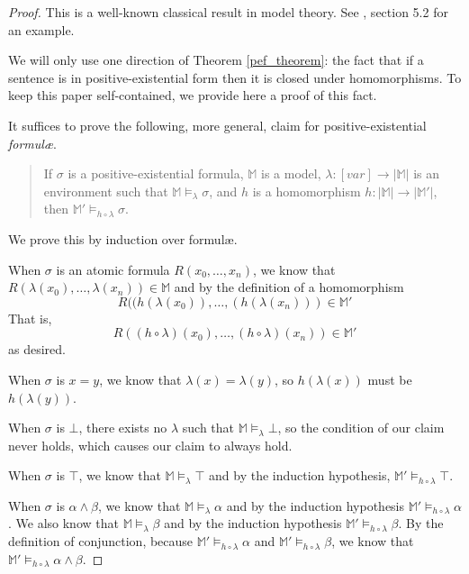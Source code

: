 		\begin{proof}
			This is a well-known classical result in model theory. See
			\cite{ChangKeisler73}, section 5.2 for an example.

			We will only use one direction of Theorem \ref{pef_theorem}: the
			fact that if a sentence is in positive-existential form then it is
			closed under homomorphisms. To keep this paper self-contained, we
			provide here a proof of this fact.

			It suffices to prove the following, more general, claim for
			positive-existential \emph{formul{\ae}}.

			\begin{quote}
				If $\sigma$ is a positive-existential formula, $\mathbb{M}$ is
				a model, $\lambda : [var] \to |\mathbb{M}|$ is an environment
				such that $\mathbb{M} \models_\lambda \sigma$, and $h$ is a
				homomorphism $h : |\mathbb{M}| \to |\mathbb{M}'|$, then
				$\mathbb{M}' \models_{h\circ\lambda} \sigma$.
			\end{quote}

			We prove this by induction over formul{\ae}.

			When $\sigma$ is an atomic formula $R(x_0,\ldots,x_n)$, we know
			that $R(\lambda(x_0),\ldots,\lambda(x_n)) \in \mathbb{M}$ and by
			the definition of a homomorphism
				\[
				R((h(\lambda(x_0)),\ldots,(h(\lambda(x_n))) \in \mathbb{M}'
				\]
			That is,
				\[
				R((h\circ\lambda)(x_0),\ldots,(h\circ\lambda)(x_n)) \in \mathbb{M'}
				\]
			as desired.

			When $\sigma$ is $x=y$, we know that $\lambda(x) = \lambda(y)$, so
			$h(\lambda(x))$ must be $h(\lambda(y))$.

			When $\sigma$ is $\bot$, there exists no $\lambda$ such that
			$\mathbb{M} \models_\lambda \bot$, so the condition of our claim
			never holds, which causes our claim to always hold.

			When $\sigma$ is $\top$, we know that $\mathbb{M} \models_\lambda
			\top$ and by the induction hypothesis, $\mathbb{M}'
			\models_{h\circ\lambda} \top$.

			When $\sigma$ is $\alpha \wedge \beta$, we know that $\mathbb{M}
			\models_\lambda \alpha$ and by the induction hypothesis
			$\mathbb{M}' \models_{h\circ\lambda} \alpha$. We also know that
			$\mathbb{M} \models_\lambda \beta$ and by the induction hypothesis
			$\mathbb{M}' \models_{h\circ\lambda} \beta$. By the definition of
			conjunction, because $\mathbb{M}' \models_{h\circ\lambda} \alpha$
			and $\mathbb{M}' \models_{h\circ\lambda} \beta$, we know that
			$\mathbb{M}' \models_{h\circ\lambda} \alpha \wedge \beta$.


\end{proof}
